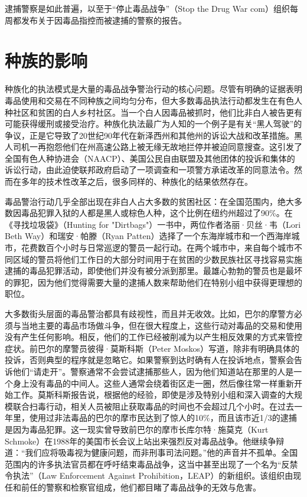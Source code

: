 \documentclass[fontset=fandol, a4paper, 12pt, openright]{ctexbook}
\begin{document}
逮捕警察是如此普遍，以至于“停止毒品战争”（Stop the Drug War com）组织每周都发布关于因毒品指控而被逮捕的警察的报告。

\section{种族的影响}

种族化的执法模式是大量的毒品战争警治行动的核心问题。尽管有明确的证据表明毒品使用和交易在不同种族之间均匀分布，但大多数毒品执法行动都发生在有色人种社区和贫困的白人乡村社区。当一个白人因毒品被抓时，他们比非白人被告更有可能获得缓刑或接受治疗。种族化执法最广为人知的一个例子是有关“黑人驾驶”的争议，正是它导致了20世纪90年代在新泽西州和其他州的诉讼大战和改革措施。黑人司机一再抱怨他们在州高速公路上被无缘无故地拦停并被迫同意搜查。这引发了全国有色人种协进会（NAACP）、美国公民自由联盟及其他团体的投诉和集体的诉讼行动，由此迫使联邦政府启动了一项调查和一项警方承诺改革的同意法令。然而在多年的技术性改革之后，很多同样的、种族化的结果依然存在。

毒品警治行动几乎全部出现在非白人占大多数的贫困社区：在全国范围内，绝大多数因毒品犯罪入狱的人都是黑人或棕色人种，这个比例在纽约州超过了90\%。在《寻找垃圾袋》（Hunting for "Dirtbags"）一书中，两位作者洛丽·贝丝·韦（Lori Beth Way）和瑞安·帕滕（Ryan Patten）选择了一个东海岸城市和一个西海岸城市，花费数百个小时与日常巡逻的警员一起行动。在两个城市中，来自每个城市不同区域的警员将他们工作日的大部分时间用于在贫困的少数民族社区寻找容易实施逮捕的毒品犯罪活动，即使他们并没有被分派到那里。最雄心勃勃的警员也是最坏的罪犯，因为他们觉得需要大量的逮捕人数来帮助他们在特别小组中获得更理想的职位。

大多数街头层面的毒品警治都具有歧视性，而且并无收效。比如，巴尔的摩警方必须与当地主要的毒品市场做斗争，但在很大程度上，这些行动对毒品的交易和使用没有产生任何影响。相反，他们的工作已经被削减为以产生相反效果的方式来管控症状。前巴尔的摩警员彼得·莫斯科斯（Peter Moskos）写道，除非有明确具体的投诉，否则典型的程序就是忽略它。如果警察到达时确有人在投诉地点，警察会告诉他们“请走开”。警察通常不会尝试逮捕那些人，因为他们知道站在那里的人是一个身上没有毒品的中间人。这些人通常会绕着街区走一圈，然后像往常一样重新开始工作。莫斯科斯报告说，根据他的经验，即使是涉及特别小组和深入调查的大规模联合扫毒行动，相关人员被阻止获取毒品的时间也不会超过几个小时。在过去一年里，使用过非法毒品的巴尔的摩市民达到了惊人的10\%，而且该市近1/3的逮捕是因为毒品犯罪。这一现实曾导致前巴尔的摩市长库尔特·施莫克（Kurt Schmoke）在1988年的美国市长会议上站出来强烈反对毒品战争。他继续争辩道：“我们应将吸毒视为健康问题，而非刑事司法问题。”他的声音并不孤单。全国范围内的许多执法官员都在呼吁结束毒品战争，这当中甚至出现了一个名为“反禁令执法”（Law Enforcement Against Prohibition，LEAP）的新组织。该组织由现任和前任的警察和检察官组成，他们都目睹了毒品战争的无效与危害。
\end{document}
